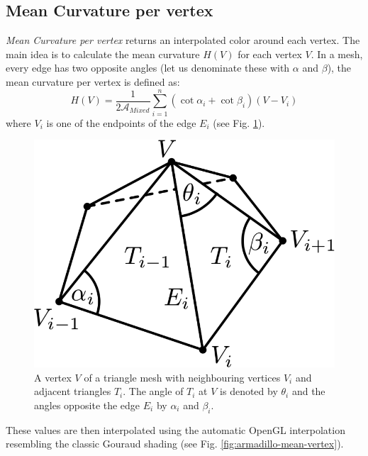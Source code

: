 \subsection{Mean Curvature per vertex}
\textit{Mean Curvature per vertex} returns an interpolated color around each vertex. The main idea is to calculate the mean curvature $H(V)$ for each vertex $V$. In a mesh, every edge has two opposite angles (let us denominate these with $\alpha$ and $\beta$), the mean curvature per vertex is defined as:
$$H(V) = \frac{1}{2\mathcal{A}_{Mixed}} \sum_{i=1}^{n}(\cot \alpha_i + \cot \beta_i) (V - V_i)$$
where $V_i$ is one of the endpoints of the edge $E_i$ (see Fig. \ref{fig:mean-edge-cot}).
\begin{figure}[H]
    \centering
    \includegraphics[scale=0.6]{images/mean-edge-cot.png}
    \caption{A vertex $V$ of a triangle mesh with neighbouring vertices $V_i$ and adjacent triangles $T_i$. The angle of $T_i$ at $V$ is denoted by $\theta_i$ and the angles opposite the edge $E_i$ by $\alpha_i$ and $\beta_i$. \cite{geometryprocessing}}\label{fig:mean-edge-cot}
\end{figure}

These values are then interpolated using the automatic OpenGL interpolation resembling the classic Gouraud shading (see Fig. \ref{fig:armadillo-mean-vertex}).

